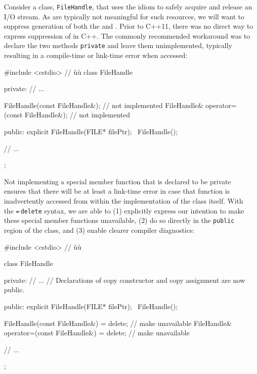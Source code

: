 Consider a class, \lstinline!FileHandle!, that uses the  idiom
to safely acquire and release an I/O stream. As 
are typically not meaningful for such resources, we will want to
suppress generation of both the  and . Prior to C++11, there was no direct way to express
suppression of  in C++. The commonly
recommended workaround was to declare the two methods \lstinline!private!
and leave them unimplemented, typically resulting in a compile-time or
link-time error when accessed:

\begin{emcppslisting}
#include <cstdio>  // ù{}ù
class FileHandle
{
private:
    // ...

    FileHandle(const FileHandle&);             // not implemented
    FileHandle& operator=(const FileHandle&);  // not implemented

public:
    explicit FileHandle(FILE* filePtr);
    ~FileHandle();

    // ...
};
\end{emcppslisting}

\noindent Not implementing a special member function that is declared to be private ensures that there will be at least a link-time error in case that function is inadvertently accessed from within the implementation of the class itself. With the \lstinline!=!\,\lstinline!delete! syntax, we are able to (1)
explicitly express our intention to make these special member
functions unavailable, (2) do so directly in the \lstinline!public! region
of the class, and (3) enable clearer compiler diagnostics:

%
%
%
\begin{emcppshiddenlisting}[emcppsbatch=e1]
#include <cstdio>  // ù{}ù
\end{emcppshiddenlisting}
\begin{emcppslisting}[emcppsbatch=e1]
class FileHandle
{
private:
    // ...
    // Declarations of copy constructor and copy assignment are now public.

public:
    explicit FileHandle(FILE* filePtr);
    ~FileHandle();

    FileHandle(const FileHandle&) = delete;             // make unavailable
    FileHandle& operator=(const FileHandle&) = delete;  // make unavailable

    // ...
};
\end{emcppslisting}

